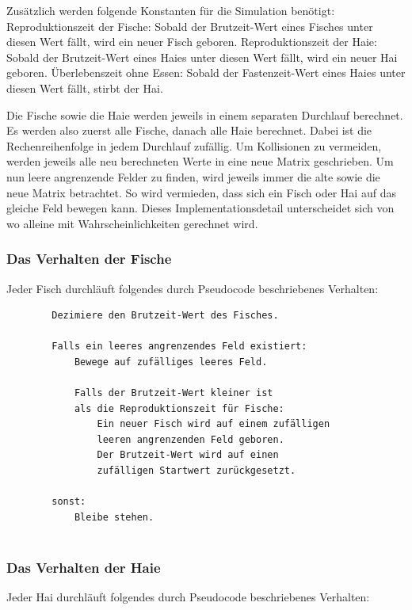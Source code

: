\documentclass[a4paper,twoside]{article}
\begin{document}
	Zusätzlich werden folgende Konstanten für die Simulation benötigt: \newline
	Reproduktionszeit der Fische: Sobald der Brutzeit-Wert eines Fisches unter diesen Wert fällt, wird ein neuer Fisch geboren. \newline
	Reproduktionszeit der Haie: Sobald der Brutzeit-Wert eines Haies unter diesen Wert fällt, wird ein neuer Hai geboren. \newline
	Überlebenszeit ohne Essen: Sobald der Fastenzeit-Wert eines Haies unter diesen Wert fällt, stirbt der Hai.
	
	Die Fische sowie die Haie werden jeweils in einem separaten Durchlauf berechnet. Es werden also zuerst alle Fische, danach alle Haie berechnet. Dabei ist die Rechenreihenfolge in jedem Durchlauf zufällig. Um Kollisionen zu vermeiden, werden jeweils alle neu berechneten Werte in eine neue Matrix geschrieben. Um nun leere angrenzende Felder zu finden, wird jeweils immer die alte sowie die neue Matrix betrachtet. So wird vermieden, dass sich ein Fisch oder Hai auf das gleiche Feld bewegen kann. Dieses Implementationsdetail unterscheidet sich von \cite{PlanetWator} wo alleine mit Wahrscheinlichkeiten gerechnet wird.
	
	
	\subsubsection{Das Verhalten der Fische}
	Jeder Fisch durchläuft folgendes durch Pseudocode beschriebenes Verhalten:

	\begin{small}
	\begin{verbatim}
		Dezimiere den Brutzeit-Wert des Fisches.
 		
		Falls ein leeres angrenzendes Feld existiert:
		    Bewege auf zufälliges leeres Feld.
 			
		    Falls der Brutzeit-Wert kleiner ist
		    als die Reproduktionszeit für Fische:
		        Ein neuer Fisch wird auf einem zufälligen
		        leeren angrenzenden Feld geboren.
		        Der Brutzeit-Wert wird auf einen
		        zufälligen Startwert zurückgesetzt.
 			
		sonst:
		    Bleibe stehen. 		
 		
	\end{verbatim}
	\end{small}
	
	\subsubsection{Das Verhalten der Haie}
	Jeder Hai durchläuft folgendes durch Pseudocode beschriebenes Verhalten:
\end{document}
